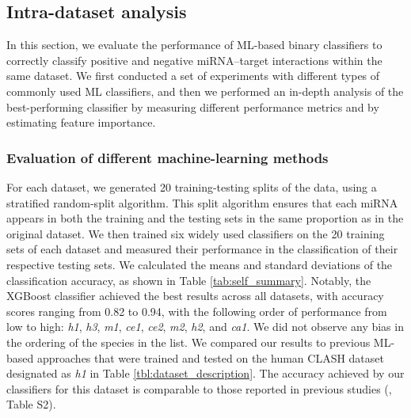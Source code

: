 \documentclass{bmcart}
\begin{document}
\subsection*{Intra-dataset analysis} \label{nameref:indataset}
In this section, we evaluate the performance of ML-based binary classifiers to correctly classify positive and negative miRNA--target interactions within the same dataset. 
We first conducted a set of experiments with different types of commonly used ML classifiers, and then we performed an in-depth analysis of the best-performing classifier by measuring different performance metrics and by estimating feature importance.

\subsubsection*{Evaluation of different machine-learning methods} \label{sec:evaluation_different_ML}
For each dataset, we generated 20 training-testing splits of the data, using a stratified random-split algorithm. This split algorithm ensures that each miRNA appears in both the training and the testing sets in the same proportion as in the original dataset.
We then trained six widely used classifiers on the 20 training sets of each dataset and measured their performance in the classification of their respective testing sets. We calculated the means and standard deviations of the classification accuracy, as shown in Table \ref{tab:self_summary}. Notably, the XGBoost classifier achieved the best results across all datasets, with accuracy scores ranging from 0.82 to 0.94, with the following order of performance from low to high: \textit{h1},  \textit{h3},  \textit{m1}, \textit{ce1}, \textit{ce2}, \textit{m2}, \textit{h2}, and \textit{ca1}. We did not observe any bias in the ordering of the species in the list.   
We compared our results to previous ML-based approaches that were trained and tested on the human CLASH dataset designated as \textit{h1} in Table \ref{tbl:dataset_description}. The accuracy achieved by our classifiers for this dataset is comparable to those reported in previous studies (, Table S2). 
\end{document}

